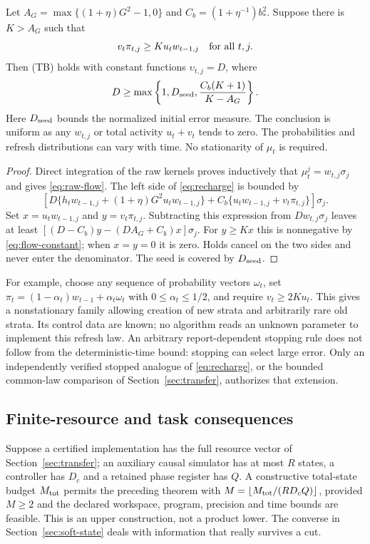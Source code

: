 \begin{proposition}\label{prop:recharge-flow}
Let $A_G=\max\{(1+\eta)G^2-1,0\}$ and $C_b=(1+\eta^{-1})b_*^2$. Suppose there is $K>A_G$ such that
\begin{equation}\label{eq:flow-balance}
 v_t\pi_{t,j}\ge K u_t w_{t-1,j}\quad\hbox{for all }t,j.
\end{equation}
Then \textup{(TB)} holds with constant functions $\upsilon_{t,j}=D$, where
\begin{equation}\label{eq:flow-constant}
 D\ge\max\left\{1,D_{\rm seed},\frac{C_b(K+1)}{K-A_G}\right\}.
\end{equation}
Here $D_{\rm seed}$ bounds the normalized initial error measure. The conclusion is uniform as any $w_{t,j}$ or total activity $u_t+v_t$ tends to zero. The probabilities and refresh distributions can vary with time. No stationarity of $\mu_t$ is required.
\end{proposition}
\begin{proof}
Direct integration of the raw kernels proves inductively that $\mu_t^j=w_{t,j}\sigma_j$ and gives \eqref{eq:raw-flow}. The left side of \eqref{eq:recharge} is bounded by
\[
 \left[D\{h_tw_{t-1,j}+(1+\eta)G^2u_tw_{t-1,j}\}
       +C_b\{u_tw_{t-1,j}+v_t\pi_{t,j}\}\right]\sigma_j.
\]
Set $x=u_tw_{t-1,j}$ and $y=v_t\pi_{t,j}$. Subtracting this expression from $D w_{t,j}\sigma_j$ leaves at least
$[(D-C_b)y-(D A_G+C_b)x]\sigma_j$.
For $y\ge Kx$ this is nonnegative by \eqref{eq:flow-constant}; when $x=y=0$ it is zero. Holds cancel on the two sides and never enter the denominator. The seed is covered by $D_{\rm seed}$.
\end{proof}

For example, choose any sequence of probability vectors $\omega_t$, set
$\pi_t=(1-\alpha_t)w_{t-1}+\alpha_t\omega_t$ with $0\le\alpha_t\le1/2$, and require $v_t\ge2K u_t$. This gives a nonstationary family allowing creation of new strata and arbitrarily rare old strata. Its control data are known; no algorithm reads an unknown parameter to implement this refresh law. An arbitrary report-dependent stopping rule does not follow from the deterministic-time bound: stopping can select large error. Only an independently verified stopped analogue of \eqref{eq:recharge}, or the bounded common-law comparison of Section~\ref{sec:transfer}, authorizes that extension.

\subsection{Finite-resource and task consequences}
Suppose a certified implementation has the full resource vector of Section~\ref{sec:transfer}; an auxiliary causal simulator has at most $R$ states, a controller has $D_c$ and a retained phase register has $Q$. A constructive total-state budget $M_{\rm tot}$ permits the preceding theorem with $M=\lfloor M_{\rm tot}/(RD_cQ)\rfloor$, provided $M\ge2$ and the declared workspace, program, precision and time bounds are feasible. This is an upper construction, not a product lower. The converse in Section~\ref{sec:soft-state} deals with information that really survives a cut.

